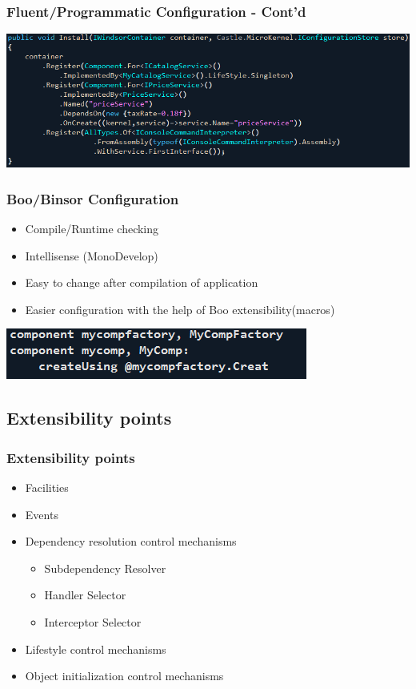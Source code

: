 \documentclass[turkish,handout]{beamer}
\begin{document}
		\frame
		{
			\frametitle{Fluent/Programmatic Configuration - Cont'd}
			\begin{center}
				\includegraphics[scale=0.40]{images/fluentconfiguration.png}
			\end{center}
		}
		\frame
		{
			\frametitle{Boo/Binsor Configuration}
			\begin{itemize}
				\item<1->Compile/Runtime checking 
				\item<2->Intellisense (MonoDevelop)
				\item<3->Easy to change after compilation of application
				\item<4->Easier configuration with the help of Boo extensibility(macros)
			\end{itemize}
			\begin{center}
				\includegraphics[scale=0.40]{images/binsorconfiguration.png}
			\end{center}
		}
	\subsection{Extensibility points}
		 \frame
			{
				\frametitle{Extensibility points}
			  \begin{itemize}
			  	\item<1->Facilities
			  	\item<2->Events
			  	\item<3->Dependency resolution control mechanisms
			  	\begin{itemize}
			  	  \item<4->Subdependency Resolver
			  		\item<5->Handler Selector
			  		\item<6->Interceptor Selector
			  	\end{itemize}
			  	\item<7->Lifestyle control mechanisms
			  	\item<8->Object initialization control mechanisms
			  \end{itemize}
			}
\end{document}
